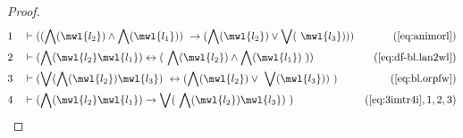 \begin{proof}
\begin{align}
  1 &&  & \vdash ( ( \bigwedge( \mwl{l_2} ) \wedge \bigwedge( \mwl{l_1} ) )
     ~\rightarrow ( \bigwedge( \mwl{l_2} ) \vee \bigvee(
     ~\mwl{l_3} ) ) )&(\mbox{\ref{eq:animorl}})\notag
  \\ 2 &&  & \vdash ( \bigwedge( \mwl{l_2} \mwl{l_1} ) \leftrightarrow (
     ~\bigwedge( \mwl{l_2} ) \wedge \bigwedge( \mwl{l_1} )
     ~) )&(\mbox{\ref{eq:df-bl.lan2wl}})\notag
  \\ 3 &&  & \vdash ( \bigvee( \bigwedge( \mwl{l_2} ) \mwl{l_3} )
     ~\leftrightarrow ( \bigwedge( \mwl{l_2} ) \vee
     ~\bigvee( \mwl{l_3} ) )
     ~)&(\mbox{\ref{eq:bl.orpfw}})\notag
  \\ 4 &&  & \vdash ( \bigwedge( \mwl{l_2} \mwl{l_1} ) \rightarrow \bigvee(
     ~\bigwedge( \mwl{l_2} ) \mwl{l_3} )
     ~)&(\mbox{\ref{eq:3imtr4i}},1,2,3)\notag
\end{align}
\end{proof}

